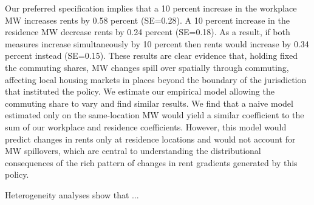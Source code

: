 
Our preferred specification implies that a 10 percent increase in the workplace
MW increases rents by 0.58 percent (SE=0.28).
A 10 percent increase in the residence MW decrease rents by 0.24 percent
(SE=0.18). 
As a result, if both measures increase simultaneously by 10 percent then 
rents would increase by 0.34 percent instead (SE=0.15).
These results are clear evidence that, holding fixed the commuting shares, MW 
changes spill over spatially through commuting, affecting local housing markets 
in places beyond the boundary of the jurisdiction that instituted the policy.
We estimate our empirical model allowing the commuting share to vary and find 
similar results.
We find that a naive model estimated only on the same-location MW would yield a 
similar coefficient to the sum of our workplace and residence coefficients.
However, this model would predict changes in rents only at residence locations 
and would not account for MW spillovers, which are central to understanding the 
distributional consequences of the rich pattern of changes in rent gradients
generated by this policy.

Heterogeneity analyses show that ...


